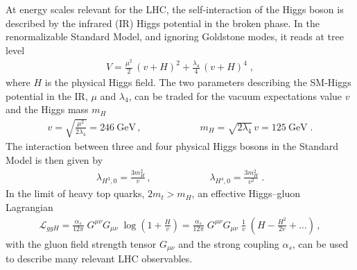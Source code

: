 \documentclass[aps,prd,11pt,tightenlines,superscriptaddress,nofootinbib,preprintnumbers,notitlepage]{revtex4-1}
\newcommand{\lag}{\mathcal{L}}
\newcommand{\qqqquad}{\qquad \qquad \qquad}
\newcommand{\gev}{\text{GeV}}
\begin{document}
At energy scales relevant for the LHC, the self-interaction of the
Higgs boson is described by the infrared (IR) Higgs potential in the broken
phase. In the renormalizable Standard Model, and ignoring Goldstone
modes, it reads at tree level
%
\begin{align}
 V = \frac{\mu^2}{2} \, (v+H)^2 + \frac{\lambda_4}{4} \, (v+H)^4 \; ,
\label{eq:pot_ir}
\end{align}
%
where $H$ is the physical Higgs field.
The two parameters describing the SM-Higgs potential in the IR,
$\mu$ and $\lambda_4$, can be traded for the vacuum expectations value $v$ and
the Higgs mass $m_H$~\cite{lecture}
%
\begin{align}
 v = \sqrt{ \frac{\mu^2}{2 \lambda_4} } = 246~\gev\,, \qqqquad 
 m_H = \sqrt{2 \lambda_4} \, v = 125~\gev \; .
\label{eq:ir_values}
\end{align}
%
The interaction between three and four physical Higgs bosons in the
Standard Model is then given by
%
\begin{align}
\lambda_{H^3,0} = \frac{3 m_H^2}{v}\,, \qqqquad 
\lambda_{H^4,0} = \frac{3 m_H^2}{v^2} \; .
\label{eq:ir_selfs}
\end{align}
%
In the limit of heavy top quarks, $2 m_t > m_H$, an effective
Higgs--gluon Lagrangian~\cite{low_energy}
%
\begin{align}
\lag_{ggH} 
=\frac{\alpha_s}{12\pi} \; G^{\mu\nu}G_{\mu\nu} \;
 \log \left(1+\frac{H}{v} \right) 
= \frac{\alpha_s}{12 \pi} \; G^{\mu\nu}G_{\mu\nu} \; \frac{1}{v} \;
\left( H - \frac{H^2}{2v} + \ldots \right)\,,
\label{eq:higgs_eff}
\end{align}
%
with the gluon field strength tensor $G_{\mu\nu}$ and the strong coupling $\alpha_s$,
can be used to describe many relevant LHC observables.\medskip
\end{document}
